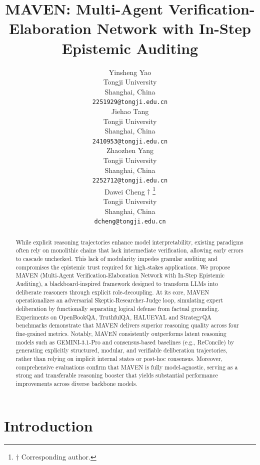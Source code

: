\documentclass{article}
\title{MAVEN: Multi-Agent Verification-Elaboration Network with In-Step Epistemic Auditing}
\author{%
  Yinsheng Yao\\
  Tongji University\\
  Shanghai, China \\
  \texttt{2251929@tongji.edu.cn} \\
  \And
  Jiehao Tang \\
  Tongji University \\
  Shanghai, China \\
  \texttt{2410953@tongji.edu.cn} \\
  \AND
  Zhaozhen Yang \\
  Tongji University \\
  Shanghai, China \\
  \texttt{2252712@tongji.edu.cn} \\
  \And
  Dawei Cheng $\dag$ \thanks{$\dag$ Corresponding author.} \\
  Tongji University \\
  Shanghai, China \\
  \texttt{dcheng@tongji.edu.cn} \\
}
\begin{document}
\maketitle

\begin{abstract}
While explicit reasoning trajectories enhance model interpretability, existing paradigms often rely on monolithic chains that lack intermediate verification, allowing early errors to cascade unchecked. This lack of modularity impedes granular auditing and compromises the epistemic trust required for high-stakes applications. We propose MAVEN (Multi-Agent Verification-Elaboration Network with In-Step Epistemic Auditing), a blackboard-inspired framework designed to transform LLMs into deliberate reasoners through explicit role-decoupling. At its core, MAVEN operationalizes an adversarial Skeptic-Researcher-Judge loop, simulating expert deliberation by functionally separating logical defense from factual grounding. Experiments on OpenBookQA, TruthfulQA, HALUEVAL and StrategyQA benchmarks demonstrate that MAVEN delivers superior reasoning quality across four fine-grained metrics. Notably, MAVEN consistently outperforms latent reasoning models such as GEMINI-3.1-Pro and consensus-based baselines (e.g., ReConcile) by generating explicitly structured, modular, and verifiable deliberation trajectories, rather than relying on implicit internal states or post-hoc consensus. Moreover, comprehensive evaluations confirm that MAVEN is fully model-agnostic, serving as a strong and transferable reasoning booster that yields substantial performance improvements across diverse backbone models.
\end{abstract}



\section{Introduction}
\label{sec:introduction}
\end{document}
